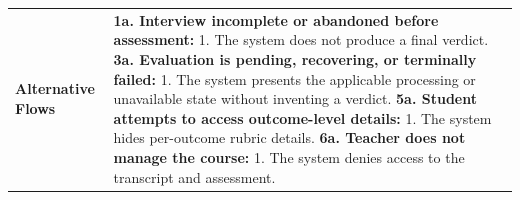 \begin{longtable}{|>{\raggedright\arraybackslash}p{}|>{\raggedright\arraybackslash}p{}|}
\textbf{Alternative Flows} &
\textbf{1a. Interview incomplete or abandoned before assessment:} \newline
\hspace*{1em}1. The system does not produce a final verdict. \newline
\textbf{3a. Evaluation is pending, recovering, or terminally failed:} \newline
\hspace*{1em}1. The system presents the applicable processing or unavailable state without inventing a verdict. \newline
\textbf{5a. Student attempts to access outcome-level details:} \newline
\hspace*{1em}1. The system hides per-outcome rubric details. \newline
\textbf{6a. Teacher does not manage the course:} \newline
\hspace*{1em}1. The system denies access to the transcript and assessment. \\
\end{longtable}



